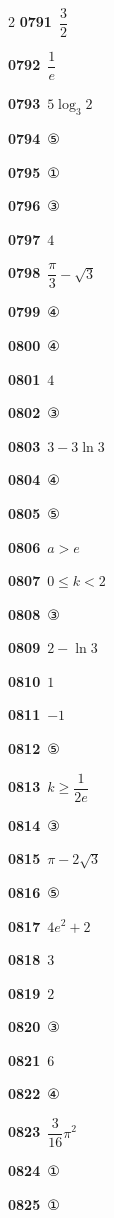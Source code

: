 \documentclass[10pt,a4paper]{article}
\begin{document}
\begin{multicols}{2}
\noindent\textbf{0791}\ $\dfrac{3}{2}$\par
\noindent\textbf{0792}\ $\dfrac{1}{e}$\par
\noindent\textbf{0793}\ $5\log_3 2$\par
\noindent\textbf{0794}\ ⑤\par
\noindent\textbf{0795}\ ①\par
\noindent\textbf{0796}\ ③\par
\noindent\textbf{0797}\ $4$\par
\noindent\textbf{0798}\ $\dfrac{\pi}{3}-\sqrt{3}$\par
\noindent\textbf{0799}\ ④\par
\noindent\textbf{0800}\ ④\par
\noindent\textbf{0801}\ $4$\par
\noindent\textbf{0802}\ ③\par
\noindent\textbf{0803}\ $3-3\ln 3$\par
\noindent\textbf{0804}\ ④\par
\noindent\textbf{0805}\ ⑤\par
\noindent\textbf{0806}\ $a>e$\par
\noindent\textbf{0807}\ $0\le k<2$\par
\noindent\textbf{0808}\ ③\par
\noindent\textbf{0809}\ $2-\ln 3$\par
\noindent\textbf{0810}\ $1$\par
\noindent\textbf{0811}\ $-1$\par
\noindent\textbf{0812}\ ⑤\par
\noindent\textbf{0813}\ $k\ge\dfrac{1}{2e}$\par
\noindent\textbf{0814}\ ③\par
\noindent\textbf{0815}\ $\pi-2\sqrt{3}$\par
\noindent\textbf{0816}\ ⑤\par
\noindent\textbf{0817}\ $4e^2+2$\par
\noindent\textbf{0818}\ $3$\par
\noindent\textbf{0819}\ $2$\par
\noindent\textbf{0820}\ ③\par
\noindent\textbf{0821}\ $6$\par
\noindent\textbf{0822}\ ④\par
\noindent\textbf{0823}\ $\dfrac{3}{16}\pi^2$\par
\noindent\textbf{0824}\ ①\par
\noindent\textbf{0825}\ ①\par

\end{multicols}
\end{document}

